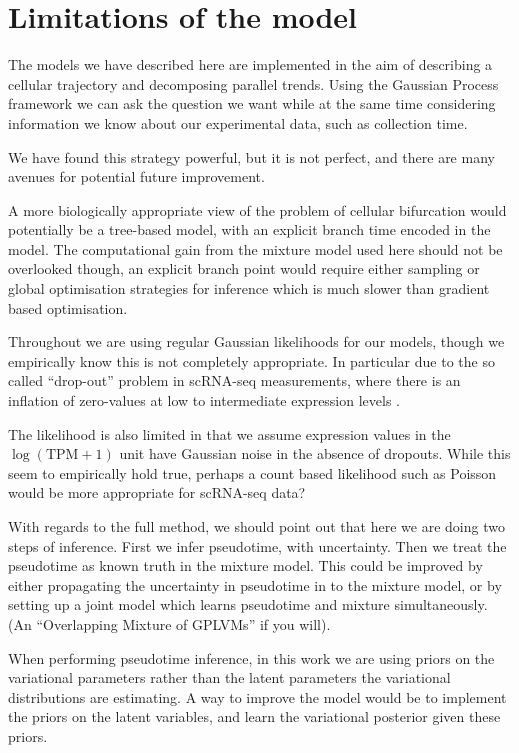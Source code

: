 \section{Limitations of the  model}

The models we have described here are implemented in the aim of describing a cellular trajectory and decomposing parallel trends. Using the Gaussian Process framework we can ask the question we want while at the same time considering information we know about our experimental data, such as collection time.

We have found this strategy powerful, but it is not perfect, and there are many avenues for potential future improvement.

A more biologically appropriate view of the problem of cellular bifurcation would  potentially be a tree-based model, with an explicit branch time encoded in the model. The computational gain from the mixture model used here should not be overlooked though, an explicit branch point would require either sampling or global optimisation strategies for inference which is much slower than gradient based optimisation.

Throughout we are using regular Gaussian likelihoods for our models, though we empirically know this is not completely appropriate. In particular due to the so called ``drop-out'' problem in scRNA-seq measurements, where there is an inflation of zero-values at low to intermediate expression levels \cite{Kharchenko2014-tj}.

The likelihood is also limited in that we assume expression values in the $ \log \left( \text{TPM} + 1 \right) $ unit have Gaussian noise in the absence of dropouts. While this seem to empirically hold true, perhaps a count based likelihood such as Poisson would be more appropriate for scRNA-seq data?

With regards to the full method, we should point out that here we are doing two steps of inference. First we infer pseudotime, with uncertainty. Then we treat the pseudotime as known truth in the mixture model. This could be improved by either propagating the uncertainty in pseudotime in to the mixture model, or by setting up a joint model which learns pseudotime and mixture simultaneously. (An ``Overlapping Mixture of GPLVMs'' if you will).

When performing pseudotime inference, in this work we are using priors on the variational parameters rather than the latent parameters the variational distributions are estimating. A way to improve the model would be to implement the priors on the latent variables, and learn the variational posterior given these priors.

